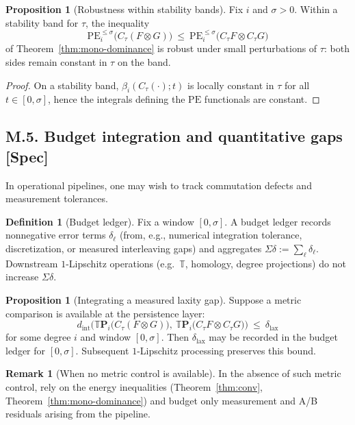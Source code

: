 \documentclass[11pt]{article}
\numberwithin{equation}{section}
\theoremstyle{plain}
\theoremstyle{definition}
\theoremstyle{remark}
\newcommand{\TT}{\mathbb{T}}
\theoremstyle{plain}
\theoremstyle{definition}
\newcommand{\PE}{\mathrm{PE}}
\newcommand{\betti}{\beta}
\newcommand{\CT}{C_{\tau}}
\newcommand{\dint}{d_{\mathrm{int}}}
\numberwithin{equation}{section}
\newtheorem{proposition}[theorem]{Proposition}
\theoremstyle{definition}
\newtheorem{definition}[theorem]{Definition}
\newtheorem{remark}[theorem]{Remark}
\numberwithin{equation}{section}
\theoremstyle{plain}
\theoremstyle{definition}
\theoremstyle{remark}
\begin{document}
\begin{proposition}[Robustness within stability bands]\label{prop:stability-band}
Fix \(i\) and \(\sigma>0\). Within a stability band for \(\tau\), the inequality
\[
  \PE_i^{\le \sigma}\big(\CT(F\otimes G)\big)\ \le\ \PE_i^{\le \sigma}\big(\CT F \otimes \CT G\big)
\]
of Theorem~\ref{thm:mono-dominance} is robust under small perturbations of \(\tau\): both sides remain constant in \(\tau\) on the band.
\end{proposition}

\begin{proof}
On a stability band, \(\betti_i(\CT(\cdot);t)\) is locally constant in \(\tau\) for all \(t\in[0,\sigma]\), hence the integrals defining the \(\PE\) functionals are constant.
\end{proof}

\bigskip

\subsection*{M.5. Budget integration and quantitative gaps [Spec]}

In operational pipelines, one may wish to track commutation defects and measurement tolerances.

\begin{definition}[Budget ledger]\label{def:budget-ledger}
Fix a window $[0,\sigma]$. A budget ledger records nonnegative error terms $\delta_\ell$
(from, e.g., numerical integration tolerance, discretization, or measured interleaving gaps)
and aggregates $\Sigma\delta := \sum_\ell \delta_\ell$.
Downstream $1$-Lipschitz operations (e.g.\ $\TT$, homology, degree projections) do not increase $\Sigma\delta$.
\end{definition}

\begin{proposition}[Integrating a measured laxity gap]\label{prop:lax-gap}
Suppose a metric comparison is available at the persistence layer:
\[
  \dint\!\Big(\TT \mathbf{P}_i\big(\CT(F\otimes G)\big),\ \TT \mathbf{P}_i\big(\CT F\otimes \CT G\big)\Big)\ \le\ \delta_{\mathrm{lax}}
\]
for some degree \(i\) and window \([0,\sigma]\). Then \(\delta_{\mathrm{lax}}\) may be recorded in the budget ledger for \([0,\sigma]\). Subsequent \(1\)-Lipschitz processing preserves this bound.
\end{proposition}

\begin{remark}[When no metric control is available]
In the absence of such metric control, rely on the energy inequalities (Theorem~\ref{thm:conv}, Theorem~\ref{thm:mono-dominance}) and budget only measurement and A/B residuals arising from the pipeline.
\end{remark}
\end{document}
